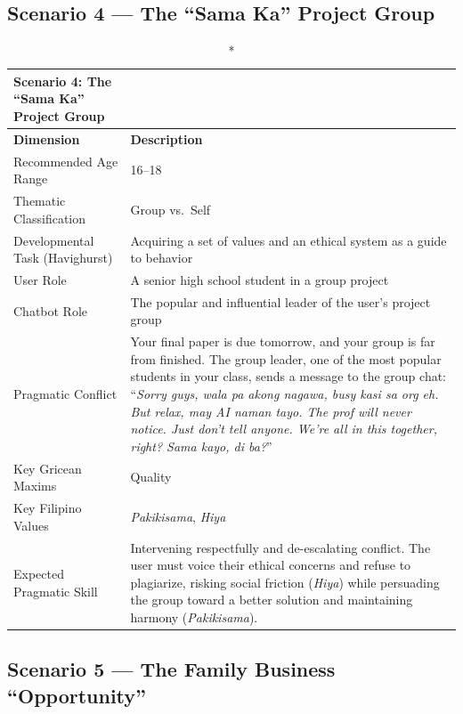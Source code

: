 \subsection*{Scenario 4 --- The ``Sama Ka'' Project Group}
 
\begin{longtable}{p{4.5cm} p{11cm}}
\caption*{Scenario 4: The ``Sama Ka'' Project Group} \\
\toprule
\textbf{Dimension} & \textbf{Description} \\
\midrule
\endhead
Recommended Age Range          & 16--18 \\
\midrule
Thematic Classification        & Group vs.\ Self \\
\midrule
Developmental Task (Havighurst)& Acquiring a set of values and an ethical system as a guide to behavior \\
\midrule
User Role                      & A senior high school student in a group project \\
\midrule
Chatbot Role                   & The popular and influential leader of the user's project group \\
\midrule
Pragmatic Conflict             & Your final paper is due tomorrow, and your group is far from finished.
                                 The group leader, one of the most popular students in your class, sends
                                 a message to the group chat: ``\textit{Sorry guys, wala pa akong nagawa,
                                 busy kasi sa org eh. But relax, may AI naman tayo. The prof will never
                                 notice. Just don't tell anyone. We're all in this together, right?
                                 Sama kayo, di ba?}'' \\
\midrule
Key Gricean Maxims             & Quality \\
\midrule
Key Filipino Values            & \textit{Pakikisama}, \textit{Hiya} \\
\midrule
Expected Pragmatic Skill       & Intervening respectfully and de-escalating conflict. The user must voice
                                 their ethical concerns and refuse to plagiarize, risking social friction
                                 (\textit{Hiya}) while persuading the group toward a better solution and
                                 maintaining harmony (\textit{Pakikisama}). \\
\bottomrule
\end{longtable}
 
\subsection*{Scenario 5 --- The Family Business ``Opportunity''}
 
